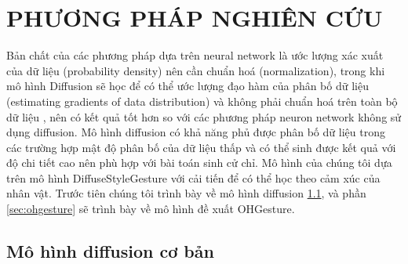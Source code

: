 %   

\chapter{PHƯƠNG PHÁP NGHIÊN CỨU}
\label{Chapter3}


Bản chất của các phương pháp dựa trên neural network là ước lượng xác xuất của dữ liệu (probability density) nên cần chuẩn hoá (normalization), trong khi mô hình Diffusion sẽ học để có thể ước lượng đạo hàm của phân bố dữ liệu (estimating gradients of data distribution) và không phải chuẩn hoá trên toàn bộ dữ liệu \cite{song2021score}, nên có kết quả tốt hơn so với các phương pháp neuron network không sử dụng diffusion.
Mô hình diffusion có khả năng phủ được phân bố dữ liệu trong các trường hợp mật độ phân bố của dữ liệu thấp  và có thể sinh được kết quả với độ chi tiết cao nên phù hợp với bài toán sinh cử chỉ. Mô hình của chúng tôi dựa trên mô hình DiffuseStyleGesture \cite{yang2022DiffuseStyleGestureplus} với cải tiến để có thể học theo cảm xúc của nhân vật. Trước tiên chúng tôi trình bày về mô hình diffusion \ref{sec:summary_diffusion}, và phần \ref{sec:ohgesture} sẽ trình bày về mô hình đề xuất OHGesture. 


\section{Mô hình diffusion cơ bản}
\label{sec:summary_diffusion}

